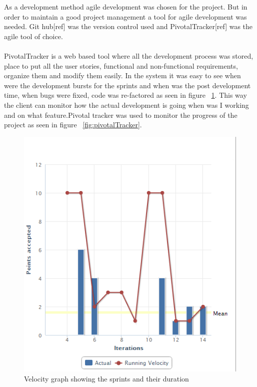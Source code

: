 As a development method agile development was chosen for the project. But in order to maintain a good project management a tool for
agile development was needed. Git hub[ref] was the version control used and PivotalTracker[ref]
was the agile tool of choice.
\paragraph{}
PivotalTracker is a web based tool where all the development process was stored, place to put all the user stories, functional
and non-functional requirements, organize them and modify them easily. In the system it was easy to see when were the development bursts for the sprints and when was the post development time, when bugs were fixed, code was re-factored as seen in figure ~\ref{fig:pivotalGraph}.
This way the client can monitor how the actual development is going when was I working and on what feature.Pivotal tracker was used to monitor the progress
of the project as seen in figure ~\ref{fig:pivotalTracker}.

\begin{figure}[htp]
\centering
\includegraphics[scale=0.6]{Figures/pivotalGraph.png}
\caption{Velocity graph showing the sprints and their duration}
\label{fig:pivotalGraph}
\end{figure}

